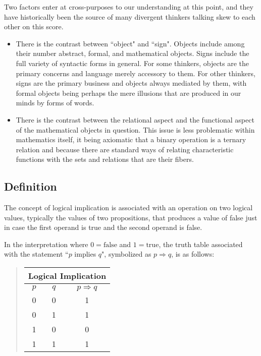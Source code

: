 \documentclass[12pt]{article}
\begin{document}
Two factors enter at cross-purposes to our understanding at this point, and they have historically been the source of many divergent thinkers talking skew to each other on this score.

\begin{itemize}
\item
There is the contrast between ``object" and ``sign".  Objects include among their number abstract, formal, and mathematical objects.  Signs include the full variety of syntactic forms in general.  For some thinkers, objects are the primary concerns and language merely accessory to them.  For other thinkers, signs are the primary business and objects always mediated by them, with formal objects being perhaps the mere illusions that are produced in our minds by forms of words.
\item
There is the contrast between the relational aspect and the functional aspect of the mathematical objects in question.  This issue is less problematic within mathematics itself, it being axiomatic that a binary operation is a ternary relation and because there are standard ways of relating characteristic functions with the sets and relations that are their fibers.
\end{itemize}

\subsection{Definition}

The concept of logical implication is associated with an operation on two logical values, typically the values of two propositions, that produces a value of false just in case the first operand is true and the second operand is false.

In the interpretation where $0 = \mathrm{false}$ and $1 = \mathrm{true}$, the truth table associated with the statement ``$p$ implies $q$", symbolized as $p \Rightarrow q$, is as follows:

\begin{quote}\begin{tabular}{|c|c|c|}
\multicolumn{3}{c}{Logical Implication} \\
\hline
$p$ & $q$ & $p \Rightarrow q$ \\
\hline\hline
 0  &  0  &  1 \\
 0  &  1  &  1 \\
 1  &  0  &  0 \\
 1  &  1  &  1 \\
\hline
\end{tabular}\end{quote}
\end{document}

